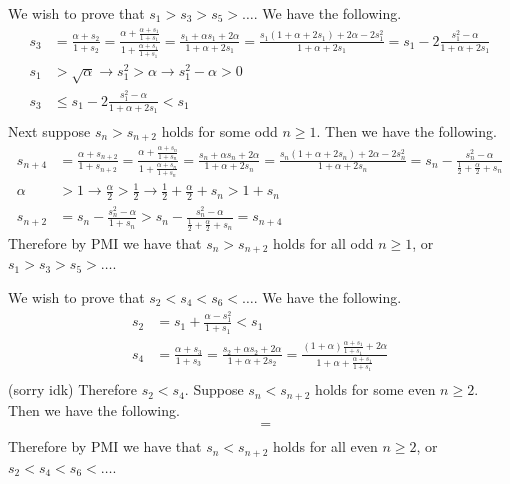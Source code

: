 \documentclass{homework}
\begin{document}
\maketitle


\question
\begin{alphaparts}
\questionpart We wish to prove that $s_1 > s_3 > s_5 > \dots$. We have the following.
\begin{align*}
	s_3     &=  \frac{\alpha + s_2}{1 + s_2}
			=	\frac{\alpha + \frac{\alpha + s_1}{1 + s_1}}{1 + \frac{\alpha + s_1}{1 + s_1}}
			=   \frac{s_1 + \alpha s_1 + 2\alpha}{1 + \alpha + 2s_1}  
			=   \frac{s_1(1 + \alpha + 2s_1) + 2\alpha - 2s_1^2}{1 + \alpha + 2s_1}
			=   s_1 - 2 \frac{s_1^2 - \alpha}{1 + \alpha + 2s_1}    \\
	s_1	    &>	\sqrt{\alpha}
			\rightarrow s_1^2 > \alpha
			\rightarrow s_1^2 - \alpha > 0 \\    
	s_3 &\leq s_1 - 2 \frac{s_1^2 - \alpha}{1 + \alpha + 2s_1} < s_1 \\
\end{align*}
Next suppose $s_n > s_{n+2}$ holds for some odd $n \ge 1$. Then we have the following.
\begin{align*}
	s_{n+4}	&=	\frac{\alpha + s_{n+2}}{1 + s_{n+2}}
			=	\frac{\alpha + \frac{\alpha + s_n}{1 + s_n}}{1 + \frac{\alpha + s_n}{1 + s_n}}
			=   \frac{s_n + \alpha s_n + 2\alpha}{1 + \alpha + 2s_n}
			=   \frac{s_n(1 + \alpha + 2s_n) + 2\alpha - 2s_n^2}{1 + \alpha + 2s_n}
			=   s_n - \frac{s_n^2 - \alpha}{\frac{1}{2} + \frac{\alpha}{2} + s_n}    \\
	\alpha  &> 1
		\rightarrow  \frac{\alpha}{2} > \frac{1}{2}
		\rightarrow \frac{1}{2} + \frac{\alpha}{2} + s_n > 1 + s_n \\
	s_{n+2} &=  s_n - \frac{s_n^2 - \alpha}{1 + s_n}
			> s_n - \frac{s_n^2 - \alpha}{\frac{1}{2} + \frac{\alpha}{2} + s_n}
			= s_{n+4}
\end{align*}
Therefore by PMI we have that $s_n > s_{n+2}$ holds for all odd $n \ge 1$, or $s_1 > s_3 > s_5 > \dots$.

\questionpart We wish to prove that $s_2 < s_4 < s_6 < \dots$. We have the following.
\begin{align*}
	s_2 &=  s_1 + \frac{\alpha - s_1^2}{1 + s_1}  <  s_1    \\
	s_4	&=	\frac{\alpha + s_3}{1 + s_3}
		=   \frac{s_2 + \alpha s_2 + 2\alpha}{1 + \alpha + 2s_2}
		=   \frac{(1 + \alpha) \frac{\alpha + s_1}{1 + s_1} + 2\alpha}{1 + \alpha + \frac{\alpha + s_1}{1 + s_1}}  \\
\end{align*}
(sorry idk) Therefore $s_2 < s_4$. Suppose $s_n < s_{n+2}$ holds for some even $n \ge 2$. Then we have the following.
\begin{align*}
		&=		\\
\end{align*}
Therefore by PMI we have that $s_n < s_{n+2}$ holds for all even $n \ge 2$, or $s_2 < s_4 < s_6 < \dots$.


\end{alphaparts}
\end{document}
